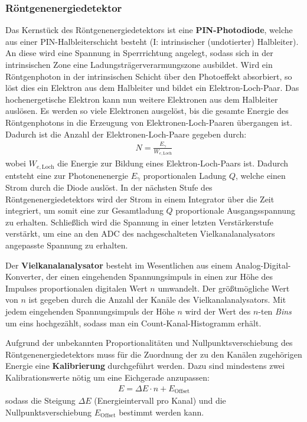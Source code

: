 \documentclass[11pt, a4paper]{article}
\begin{document}
\subsubsection{Röntgenenergiedetektor}
\label{sec:energiedetektor}

Das Kernstück des Röntgenenergiedetektors ist eine \textbf{PIN-Photodiode}, welche aus einer PIN-Halbleiterschicht besteht (I: intrinsischer (undotierter) Halbleiter).
An diese wird eine Spannung in Sperrrichtung angelegt, sodass sich in der intrinsischen Zone eine Ladungsträgerverarmungszone ausbildet.
Wird ein Röntgenphoton in der intrinsischen Schicht über den Photoeffekt absorbiert, so löst dies ein Elektron aus dem Halbleiter und bildet ein Elektron-Loch-Paar.
Das hochenergetische Elektron kann nun weitere Elektronen aus dem Halbleiter auslösen.
Es werden so viele Elektronen ausgelöst, bis die gesamte Energie des Röntgenphotons in die Erzeugung von Elektronen-Loch-Paaren übergangen ist.
Dadurch ist die Anzahl der Elektronen-Loch-Paare gegeben durch:
\begin{align}
  N = \frac{E_\gamma}{W_{e,\mathrm{Loch}}}
\end{align}
wobei $W_{e,\mathrm{Loch}}$ die Energie zur Bildung eines Elektron-Loch-Paars ist.
Dadurch entsteht eine zur Photonenenergie $E_\gamma$ proportionalen Ladung $Q$, welche einen Strom durch die Diode auslöst.
In der nächsten Stufe des Röntgenenergiedetektors wird der Strom in einem Integrator über die Zeit integriert, um somit eine zur Gesamtladung $Q$ proportionale Ausgangsspannung zu erhalten.
Schließlich wird die Spannung in einer letzten Verstärkerstufe verstärkt, um eine an den ADC des nachgeschalteten Vielkanalanalysators angepasste Spannung zu erhalten.

Der \textbf{Vielkanalanalysator} besteht im Wesentlichen aus einem Analog-Digital-Konverter, der einen eingehenden Spannungsimpuls in einen zur Höhe des Impulses proportionalen digitalen Wert $n$ umwandelt.
Der größtmögliche Wert von $n$ ist gegeben durch die Anzahl der Kanäle des Vielkanalanalysators.
Mit jedem eingehenden Spannungsimpuls der Höhe $n$ wird der Wert des $n$-ten \emph{Bins} um eins hochgezählt, sodass man ein Count-Kanal-Histogramm erhält.

Aufgrund der unbekannten Proportionalitäten und Nullpunktsverschiebung des Röntgenenergiedetektors muss für die Zuordnung der zu den Kanälen zugehörigen Energie eine \textbf{Kalibrierung} durchgeführt werden.
Dazu sind mindestens zwei Kalibrationswerte nötig um eine Eichgerade anzupassen:
\begin{align}
  E = \Delta E \cdot n + E_\mathrm{Offset}
  \label{eq:kalibrierung}
\end{align}
sodass die Steigung $\Delta E$ (Energieintervall pro Kanal) und die Nullpunktsverschiebung $E_\mathrm{Offset}$ bestimmt werden kann.
\end{document}
